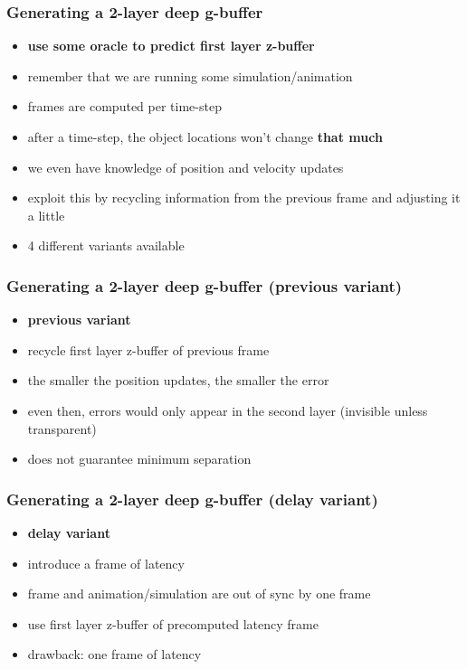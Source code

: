 \documentclass[aspectratio=169]{beamer}
\begin{document}
	\begin{frame}
		\frametitle{Generating a 2-layer deep g-buffer}
		\begin{itemize}
			\item \textbf{use some oracle to predict first layer z-buffer}
			\item remember that we are running some simulation/animation
			\item frames are computed per time-step
			\item after a time-step, the object locations won't change \textbf{that much}
			\item we even have knowledge of position and velocity updates
			\item exploit this by recycling information from the previous frame and adjusting it a little
			\item 4 different variants available
			
		\end{itemize}
	\end{frame}	

	\begin{frame}
		\frametitle{Generating a 2-layer deep g-buffer (previous variant)}
		\begin{itemize}
			\item \textbf{previous variant}
			\item recycle first layer z-buffer of previous frame
			\item the smaller the position updates, the smaller the error
			\item even then, errors would only appear in the second layer (invisible unless transparent)
			\item does not guarantee minimum separation
		\end{itemize}
	\end{frame}	

	\begin{frame}
		\frametitle{Generating a 2-layer deep g-buffer (delay variant)}
		\begin{itemize}
			\item \textbf{delay variant}
			\item introduce a frame of latency
			\item frame and animation/simulation are out of sync by one frame
			\item use first layer z-buffer of precomputed latency frame 
			\item drawback: one frame of latency
		\end{itemize}
	\end{frame}	
\end{document}
